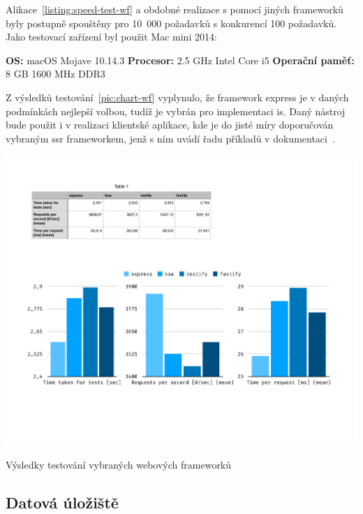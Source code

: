 Alikace~\ref{listing:speed-test-wf} a obdobné realizace s pomocí jiných frameworků byly postupně spouštěny pro 10~000 požadavků s konkurencí 100 požadavků. Jako testovací zařízení byl použit Mac mini 2014:

\textbf{OS:} macOS Mojave 10.14.3\newline
\textbf{Procesor:} 2.5 GHz Intel Core i5\newline
\textbf{Operační paměť:} 8 GB 1600 MHz DDR3

Z výsledků testování~\ref{pic:chart-wf} vyplynulo, že framework express je v daných podmínkách nejlepší volbou, tudíž je vybrán pro implementaci \gls{is}. Daný nástroj bude použit i v realizaci klientské aplikace, kde je do jisté míry doporučován vybraným \gls{ssr} frameworkem, jenž s ním uvádí řadu příkladů v dokumentaci~\cite{nextExpress}.


\begin{fig:illustration}
   \includegraphics[width=1\textwidth]{images/chart-wf.pdf}
   \caption{Výsledky testování vybraných webových frameworků}\label{pic:chart-wf}
\end{fig:illustration}




\subsection{Datová úložiště}

